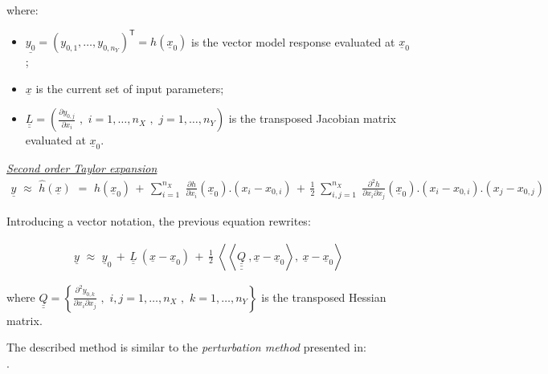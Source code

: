 {  where:
  \begin{itemize}
  \item $\underline{y_0} = (y_{0,1} , \dots, y_{0,n_Y})^{\textsf{T}}=  h(\underline{x}_0)$ is the vector model response evaluated at $\underline{x}_0$;
  \item $\underline{x}$ is the current set of input parameters;
  \item $\underline{\underline{L}} = \left( \frac{\partial y_{0,j}}{\partial x_i} \, \, , \, \, i=1,\ldots, n_X \, \, , \, \, j=1, \ldots, n_Y \right)$ is the transposed Jacobian matrix evaluated at $\underline{x}_0$.
  \end{itemize}

  \underline{\textit{Second order Taylor expansion}}\\
  \begin{eqnarray*}
    \underline{y} \, \, \approx \, \, \widehat{h}(\underline{x}) \, \, = \, \,
    h(\underline{x}_0) \, +  \, \sum_{i=1}^{n_{X}} \;  \frac{\partial h}{\partial x_i}(\underline{x}_0).\left(x_i - x_{0,i} \right) \, + \, \frac{1}{2} \; \sum_{i,j=1}^{n_X} \;  \frac{\partial^2 h}{\partial x_i \partial x_j}(\underline{x}_0).\left(x_i - x_{0,i} \right).\left(x_j - x_{0,j} \right)
  \end{eqnarray*}

  Introducing a vector notation, the previous equation rewrites:

  \begin{align*}
    \underline{y} \, \, \approx  \, \,  \underline{y}_0 \, + \,  \underline{\underline{L}} \: \left(\underline{x}-\underline{x}_0\right) \, + \,  \frac{1}{2} \; \left\langle \left\langle\underline{\underline{\underline{Q}}}\:,\underline{x}-\underline{x}_0 \right\rangle,\:\underline{x}-\underline{x}_0 \right\rangle
  \end{align*}

  where $\underline{\underline{Q}} = \left\{ \frac{\partial^2 y_{0,k}}{\partial x_i \partial x_j} \, \, , \, \, i,j=1,\ldots, n_X \, \, , \, \, k=1, \ldots, n_Y \right\}$ is the transposed Hessian matrix.

}
{The described method is similar to the \textit{perturbation method} presented in: \\
  .
}

